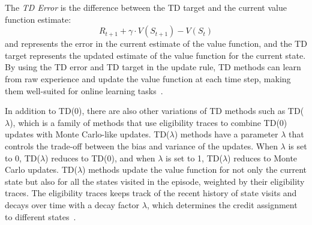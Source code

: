 \documentclass[../xlapes02]{subfiles}
\begin{document}
    The \emph{TD Error} is the difference between the TD target and the current value function estimate:
    \begin{equation}
        R_{t+1}+\gamma\cdot V(S_{t+1})-V(S_t)
    \end{equation}
    and represents the error in the current estimate of the value function, and the TD target represents the updated estimate of the value function for the current state. By using the TD error and TD target in the update rule, TD methods can learn from raw experience and update the value function at each time step, making them well-suited for online learning tasks~\cite{sutton2018reinforcement}.



    In addition to TD(0), there are also other variations of TD methods such as TD($\lambda$), which is a family of methods that use eligibility traces to combine TD(0) updates with Monte Carlo-like updates. TD($\lambda$) methods have a parameter $\lambda$ that controls the trade-off between the bias and variance of the updates. When $\lambda$ is set to 0, TD($\lambda$) reduces to TD(0), and when $\lambda$ is set to 1, TD($\lambda$) reduces to Monte Carlo updates. TD($\lambda$) methods update the value function for not only the current state but also for all the states visited in the episode, weighted by their eligibility traces. The eligibility traces keeps track of the recent history of state visits and decays over time with a decay factor $\lambda$, which determines the credit assignment to different states~\cite{sutton2018reinforcement}.
\end{document}
